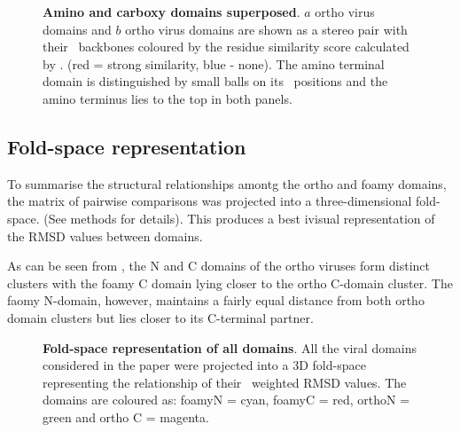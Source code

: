\begin{figure}
\centering
{}
\begin{footnotesize}
\caption{
\label{Fig:final}
{\bf Amino and carboxy domains superposed}.
$a$ ortho virus domains and
$b$ ortho virus domains are shown as a stereo pair with
their \CA\ backbones coloured by
the residue similarity score calculated by \SAP. (red = strong similarity, blue - none).
The amino terminal domain is distinguished by small balls on its \CA\ positions and
the amino terminus lies to the top in both panels.
}
\end{footnotesize}
\end{figure}

\subsection{Fold-space representation}

To summarise the structural relationships amontg the ortho and foamy domains, the matrix
of pairwise comparisons was projected into a three-dimensional fold-space.  (See methods
for details).   This produces a best ivisual representation of the RMSD values between domains.

As can be seen from , the N and C domains of the ortho viruses form distinct
clusters with the foamy C domain lying closer to the ortho C-domain cluster.   The faomy
N-domain, however, maintains a fairly equal distance from both ortho domain clusters but
lies closer to its C-terminal partner.

\begin{figure}
\centering
\epsfxsize=300pt 
\begin{footnotesize}
\caption{
\label{Fig:final}
{\bf Fold-space representation of all domains}.
All the viral domains considered in the paper were projected into a 3D fold-space representing
the relationship of their \SAP\ weighted RMSD values.   The domains are coloured as:
foamyN = cyan, foamyC = red, orthoN = green and ortho C = magenta. 
}
\end{footnotesize}
\end{figure}
